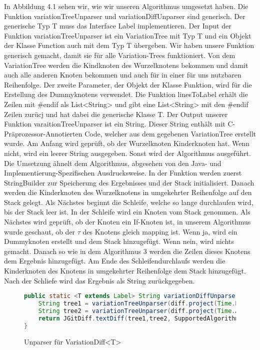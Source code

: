 In Abbildung 4.1 sehen wir, wie wir unseren Algorithmus umgesetzt haben. Die Funktion variationTreeUnparser und variationDiffUnparser sind generisch. Der generische Typ T muss das Interface Label implementieren. Der Input der Funktion variationTreeUnparser ist ein VariationTree mit Typ T und ein Objekt der Klasse Function auch mit dem Typ T übergeben. Wir haben unsere Funktion generisch gemacht, damit sie für alle Variation-Trees funktioniert. Von dem VariationTree werden die Kindknoten des Wurzelknotens bekommen und damit auch alle anderen Knoten bekommen und auch für in einer für uns nutzbaren Reihenfolge. Der zweite Parameter, der Objekt der Klasse Funktion, wird für die Erstellung des Dummyknotens verwendet. Die Funktion linesToLabel erhält die Zeilen mit \#endif als List<String> und gibt eine List<String> mit den \#endif Zeilen zurücj und hat dabei die generische Klasse T. Der Output unserer Funktion varaitionTreeUnparser ist ein String. Dieser String enthält mit C-Präprozessor-Annotierten Code, welcher aus dem gegebenen VariationTree erstellt wurde. Am Anfang wird geprüft, ob der Wurzelknoten Kinderknoten hat. Wenn nicht, wird ein leerer String ausgegeben. Sonst wird der Algorithmus ausgeführt. Die Umsetzung ähnelt dem Algorithmus, abgesehen von den Java- und Implementierung-Spezifischen Ausdrucksweise. In der Funktion werden zuerst StringBuilder zur Speicherung des Ergebnisses und der Stack initialisiert. Danach werden die Kinderknoten des Wurzelknotens in umgekehrter Reihenfolge auf den Stack gelegt. Als Nächstes beginnt die Schleife, welche so lange durchlaufen wird, bis der Stack leer ist. In der Schleife wird ein Knoten vom Stack genommen. Als Nächstes wird geprüft, ob der Knoten ein If-Knoten ist, in unserem Algorithmus wurde geschaut, ob der $\tau$ des Knotens gleich mapping ist. Wenn ja, wird ein Dummyknoten erstellt und dem Stack hinzugefügt. Wenn nein, wird nichts gemacht. Danach so wie in dem Algorithmus 3 werden die Zeilen dieses Knotens dem Ergebnis hinzugefügt. Am Ende des Schleifendurchlaufs werden die Kinderknoten des Knotens in umgekehrter Reihenfolge dem Stack hinzugefügt. Nach der Schliefe wird das Ergebnis als String zurückgegeben. \\


\begin{figure}[h]
	\centering
\begin{lstlisting}[language=java]
public static <T extends Label> String variationDiffUnparser(VariationDiff<T> diff,Function<List<String>,T> linesToLabel) throws IOException {
	String tree1 = variationTreeUnparser(diff.project(Time.BEFORE),linesToLabel);
	String tree2 = variationTreeUnparser(diff.project(Time.AFTER),linesToLabel);
	return JGitDiff.textDiff(tree1,tree2, SupportedAlgorithm.MYERS);
}
\end{lstlisting}
	\caption{Unparser für VariationDiff<T>}
\end{figure}


